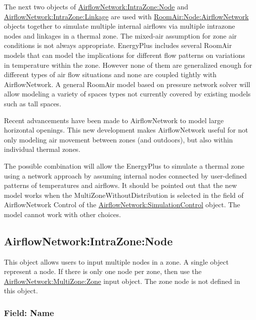 The next two objects of \hyperref[airflownetworkintrazonenode]{AirflowNetwork:IntraZone:Node} and \hyperref[airflownetworkintrazonelinkage]{AirflowNetwork:IntraZone:Linkage} are used with \hyperref[roomairnodeairflownetwork]{RoomAir:Node:AirflowNetwork} objects together to simulate multiple internal airflows via multiple intrazone nodes and linkages in a thermal zone. The mixed-air assumption for zone air conditions is not always appropriate. EnergyPlus includes several RoomAir models that can model the implications for different flow patterns on variations in temperature within the zone. However none of them are generalized enough for different types of air flow situations and none are coupled tightly with AirflowNetwork. A general RoomAir model based on pressure network solver will allow modeling a variety of spaces types not currently covered by existing models such as tall spaces.

Recent advancements have been made to AirflowNetwork to model large horizontal openings. This new development makes AirflowNetwork useful for not only modeling air movement between zones (and outdoors), but also within individual thermal zones.

The possible combination will allow the EnergyPlus to simulate a thermal zone using a network approach by assuming internal nodes connected by user-defined patterns of temperatures and airflows. It should be pointed out that the new model works when the MultiZoneWithoutDistribution is selected in the field of AirflowNetwork Control of the \hyperref[airflownetworksimulationcontrol]{AirflowNetwork:\hyperref[simulationcontrol]{SimulationControl}} object. The model cannot work with other choices.

\subsection{AirflowNetwork:IntraZone:Node}\label{airflownetworkintrazonenode}

This object allows users to input multiple nodes in a zone. A single object represent a node. If there is only one node per zone, then use the \hyperref[airflownetworkmultizonezone]{AirflowNetwork:MultiZone:Zone} input object. The zone node is not defined in this object.

\subsubsection{Field: Name}\label{field-name-12-000}

